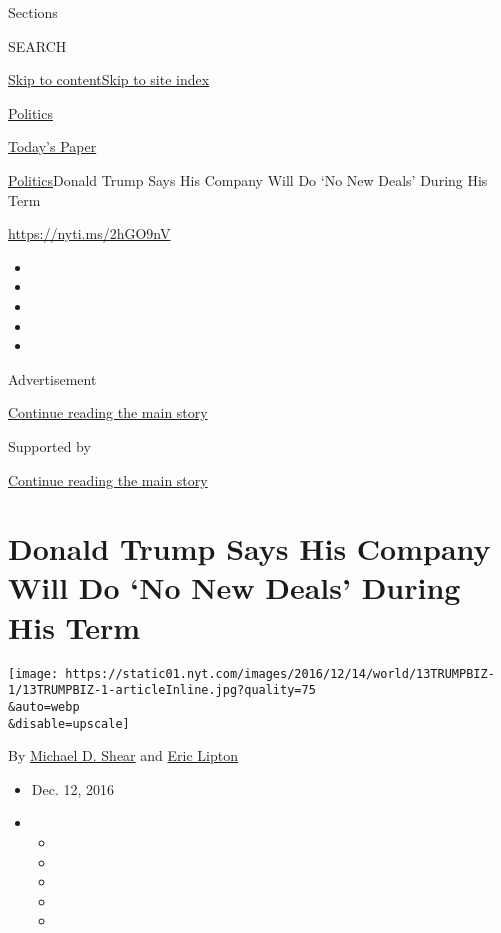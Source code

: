 Sections

SEARCH

\protect\hyperlink{site-content}{Skip to
content}\protect\hyperlink{site-index}{Skip to site index}

\href{https://www.nytimes.com/section/politics}{Politics}

\href{https://myaccount.nytimes.com/auth/login?response_type=cookie\&client_id=vi}{}

\href{https://www.nytimes.com/section/todayspaper}{Today's Paper}

\href{/section/politics}{Politics}\textbar{}Donald Trump Says His
Company Will Do `No New Deals' During His Term

\url{https://nyti.ms/2hGO9nV}

\begin{itemize}
\item
\item
\item
\item
\item
\end{itemize}

Advertisement

\protect\hyperlink{after-top}{Continue reading the main story}

Supported by

\protect\hyperlink{after-sponsor}{Continue reading the main story}

\hypertarget{donald-trump-says-his-company-will-do-no-new-deals-during-his-term}{%
\section{Donald Trump Says His Company Will Do `No New Deals' During His
Term}\label{donald-trump-says-his-company-will-do-no-new-deals-during-his-term}}

\texttt{[image: https://static01.nyt.com/images/2016/12/14/world/13TRUMPBIZ-1/13TRUMPBIZ-1-articleInline.jpg?quality=75\\\&auto=webp\\\&disable=upscale]}

By \href{http://www.nytimes.com/by/michael-d-shear}{Michael D. Shear}
and \href{http://www.nytimes.com/by/eric-lipton}{Eric Lipton}

\begin{itemize}
\item
  Dec. 12, 2016
\item
  \begin{itemize}
  \item
  \item
  \item
  \item
  \item
  \end{itemize}
\end{itemize}

